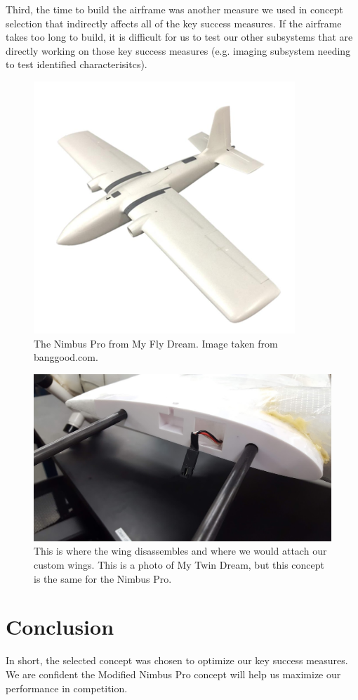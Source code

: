 \documentclass[]{auvsi_doc}
\begin{document}
Third, the time to build the airframe was another measure we used in concept selection that indirectly affects all of the key success measures. If the airframe takes too long to build, it is difficult for us to test our other subsystems that are directly working on those key success measures (e.g. imaging subsystem needing to test identified characterisitcs).

\begin{figure}[h!]
	\centering
	\includegraphics[scale=0.7]{figs/NimbusPro}
	\caption{The Nimbus Pro from My Fly Dream. Image taken from banggood.com.}
	\label{fig:nimbus}    
\end{figure}

\begin{figure}[h!]
	\centering
	\includegraphics[width=.8\columnwidth]{figs/wing}
	\caption{This is where the wing disassembles and where we would attach our custom wings. This is a photo of My Twin Dream, but this concept is the same for the Nimbus Pro.}
	\label{fig:wing}    
\end{figure}

\section{Conclusion}

In short, the selected concept was chosen to optimize our key success measures. We are confident the Modified Nimbus Pro concept will help us maximize our performance in competition.
\end{document}
